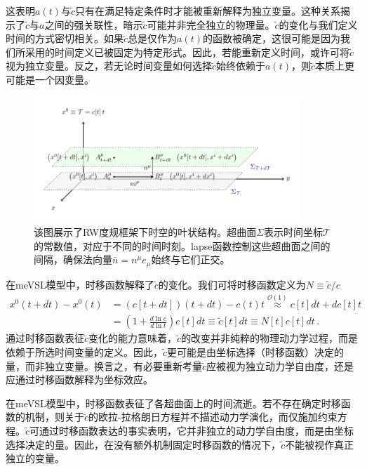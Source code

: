 \documentclass[jkps,preprint,fleqn]{revtex4}
\newcommand{\tc}{\tilde{c}}
\begin{document}
这表明$a(t)$与$\tc$只有在满足特定条件时才能被重新解释为独立变量。这种关系揭示了$\tc$与$a$之间的强关联性，暗示$\tc$可能并非完全独立的物理量。$\tc$的变化与我们定义时间的方式密切相关。如果$\tc$总是仅作为$a(t)$的函数被确定，这很可能是因为我们所采用的时间定义已被固定为特定形式。因此，若能重新定义时间，或许可将$\tc$视为独立变量。反之，若无论时间变量如何选择$\tc$始终依赖于$a(t)$，则$\tc$本质上更可能是一个因变量。

\begin{figure}
	\begin{center}
	\includegraphics[width=0.9\textwidth]{Fig2.pdf}
	\caption{该图展示了RW度规框架下时空的叶状结构。超曲面$\Sigma$表示时间坐标$\mathcal{T}$的常数值，对应于不同的时间时刻。lapse函数控制这些超曲面之间的间隔，确保法向量$\bar{n} = n^{\mu} e_{\mu}$始终与它们正交。}
	\label{Fig2}
	\end{center}
\end{figure}

在meVSL模型中，时移函数解释了$\tc$的变化。我们可将时移函数定义为$N \equiv \tc/c$
\begin{align}
x^{0}(t+dt) - x^{0}(t) &=  \left( c[t+dt] \right) \left( t+dt \right) - c(t) t \overset{\mathcal{O}(1)}{\approx} c[t] dt + dc[t] t \nonumber \\
	&= \left( 1 + \frac{d \ln c}{d \ln t} \right) c[t] dt \equiv \tilde{c}[t] dt \equiv N[t] c[t] dt \label{NmeVSL} \,.
\end{align}
通过时移函数表征$\tc$变化的能力意味着，$\tc$的改变并非纯粹的物理动力学过程，而是依赖于所选时间变量的定义。因此，$\tc$更可能是由坐标选择（时移函数）决定的量，而非独立变量。换言之，有必要重新考量$\tc$应被视为独立动力学自由度，还是应通过时移函数解释为坐标效应。

在meVSL模型中，时移函数表征了各超曲面上的时间流逝。若不存在确定时移函数的机制，则关于$\tc$的欧拉-拉格朗日方程并不描述动力学演化，而仅施加约束方程。$\tc$可通过时移函数表达的事实表明，它并非独立的动力学自由度，而是由坐标选择决定的量。因此，在没有额外机制固定时移函数的情况下，$\tc$不能被视作真正独立的变量。
\end{document}
